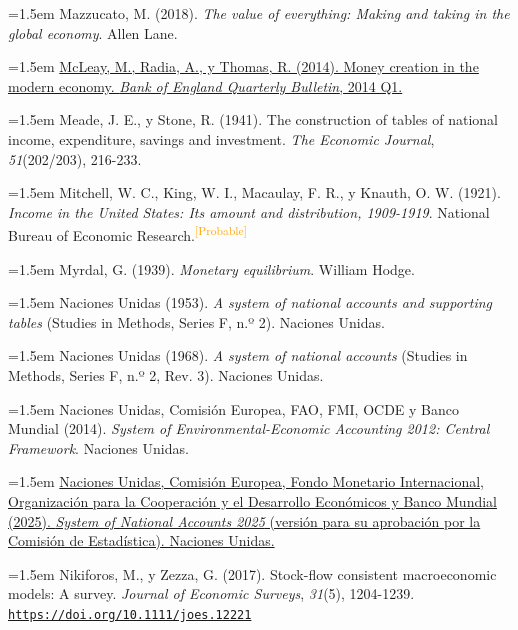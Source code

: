 \documentclass[10pt,a4paper]{article}
\begin{document}
\noindent\hangindent=1.5em Mazzucato, M. (2018). \textit{The value of everything: Making and taking in the global economy}. Allen Lane.

\noindent\hangindent=1.5em \href{https://www.bankofengland.co.uk/quarterly-bulletin/2014/q1/money-creation-in-the-modern-economy}{McLeay, M., Radia, A., y Thomas, R. (2014). Money creation in the modern economy. \textit{Bank of England Quarterly Bulletin}, 2014 Q1.}

\noindent\hangindent=1.5em Meade, J. E., y Stone, R. (1941). The construction of tables of national income, expenditure, savings and investment. \textit{The Economic Journal}, \textit{51}(202/203), 216-233.

\noindent\hangindent=1.5em Mitchell, W. C., King, W. I., Macaulay, F. R., y Knauth, O. W. (1921). \textit{Income in the United States: Its amount and distribution, 1909-1919}. National Bureau of Economic Research.\textcolor{orange}{\textsuperscript{[Probable]}}

\noindent\hangindent=1.5em Myrdal, G. (1939). \textit{Monetary equilibrium}. William Hodge.

\noindent\hangindent=1.5em Naciones Unidas (1953). \textit{A system of national accounts and supporting tables} (Studies in Methods, Series F, n.º 2). Naciones Unidas.

\noindent\hangindent=1.5em Naciones Unidas (1968). \textit{A system of national accounts} (Studies in Methods, Series F, n.º 2, Rev. 3). Naciones Unidas.

\noindent\hangindent=1.5em Naciones Unidas, Comisión Europea, FAO, FMI, OCDE y Banco Mundial (2014). \textit{System of Environmental-Economic Accounting 2012: Central Framework}. Naciones Unidas.

\noindent\hangindent=1.5em \href{https://unstats.un.org/unsd/nationalaccount/snaupdate/2025/2025_SNA_Combined.pdf}{Naciones Unidas, Comisión Europea, Fondo Monetario Internacional, Organización para la Cooperación y el Desarrollo Económicos y Banco Mundial (2025). \textit{System of National Accounts 2025} (versión para su aprobación por la Comisión de Estadística). Naciones Unidas.}

\noindent\hangindent=1.5em Nikiforos, M., y Zezza, G. (2017). Stock-flow consistent macroeconomic models: A survey. \textit{Journal of Economic Surveys}, \textit{31}(5), 1204-1239. \href{https://doi.org/10.1111/joes.12221}{\nolinkurl{https://doi.org/10.1111/joes.12221}}
\end{document}
